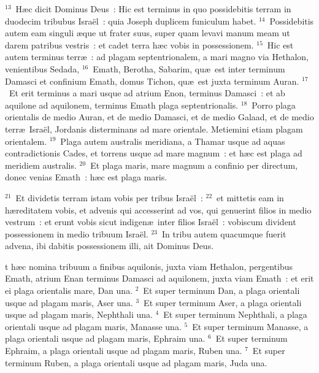 ${}^{13}$~H\ae c dicit Dominus Deus~: Hic est terminus in quo possidebitis terram in duodecim tribubus Isra\"el~: quia Joseph duplicem funiculum habet.
${}^{14}$~Possidebitis autem eam singuli \ae que ut frater suus, super quam levavi manum meam ut darem patribus vestris~: et cadet terra h\ae c vobis in possessionem.
${}^{15}$~Hic est autem terminus terr\ae~: ad plagam septentrionalem, a mari magno via Hethalon, venientibus Sedada,
${}^{16}$~Emath, Berotha, Sabarim, qu\ae\ est inter terminum Damasci et confinium Emath, domus Tichon, qu\ae\ est juxta terminum Auran.
${}^{17}$~Et erit terminus a mari usque ad atrium Enon, terminus Damasci~: et ab aquilone ad aquilonem, terminus Emath plaga septentrionalis.
${}^{18}$~Porro plaga orientalis de medio Auran, et de medio Damasci, et de medio Galaad, et de medio terr\ae\ Isra\"el, Jordanis disterminans ad mare orientale. Metiemini etiam plagam orientalem.
${}^{19}$~Plaga autem australis meridiana, a Thamar usque ad aquas contradictionis Cades, et torrens usque ad mare magnum~: et h\ae c est plaga ad meridiem australis.
${}^{20}$~Et plaga maris, mare magnum a confinio per directum, donec venias Emath~: h\ae c est plaga maris.


${}^{21}$~Et dividetis terram istam vobis per tribus Isra\"el~:
${}^{22}$~et mittetis eam in h\ae reditatem vobis, et advenis qui accesserint ad vos, qui genuerint filios in medio vestrum~: et erunt vobis sicut indigen\ae\ inter filios Isra\"el~: vobiscum divident possessionem in medio tribuum Isra\"el.
${}^{23}$~In tribu autem quacumque fuerit advena, ibi dabitis possessionem illi, ait Dominus Deus.

\bchapter
{}t h\ae c nomina tribuum a finibus aquilonis, juxta viam Hethalon, pergentibus Emath, atrium Enan terminus Damasci ad aquilonem, juxta viam Emath~: et erit ei plaga orientalis mare, Dan una.
${}^{2}$~Et super terminum Dan, a plaga orientali usque ad plagam maris, Aser una.
${}^{3}$~Et super terminum Aser, a plaga orientali usque ad plagam maris, Nephthali una.
${}^{4}$~Et super terminum Nephthali, a plaga orientali usque ad plagam maris, Manasse una.
${}^{5}$~Et super terminum Manasse, a plaga orientali usque ad plagam maris, Ephraim una.
${}^{6}$~Et super terminum Ephraim, a plaga orientali usque ad plagam maris, Ruben una.
${}^{7}$~Et super terminum Ruben, a plaga orientali usque ad plagam maris, Juda una.



